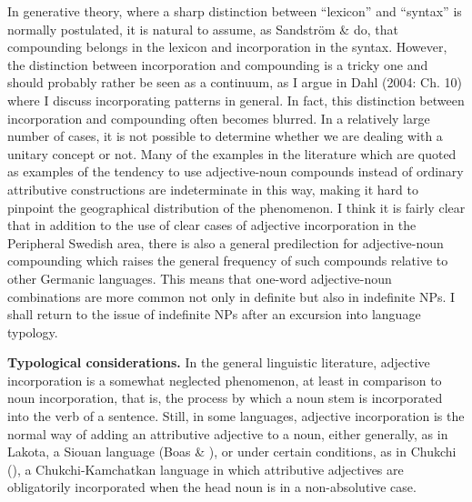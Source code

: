 \begin{styleBodytextC}
In generative theory, where a sharp distinction between “lexicon” and “syntax” is normally postulated, it is natural to assume, as Sandström \& \citet{Holmberg2003} do, that compounding belongs in the lexicon and incorporation in the syntax. However, the distinction between incorporation and compounding is a tricky one and should probably rather be seen as a continuum, as I argue in Dahl (2004: Ch. 10) where I discuss incorporating patterns in general. In fact, this distinction between incorporation and compounding often becomes blurred. In a relatively large number of cases, it is not possible to determine whether we are dealing with a unitary concept or not. Many of the examples in the literature which are quoted as examples of the tendency to use adjective-noun compounds instead of ordinary attributive constructions are indeterminate in this way, making it hard to pinpoint the geographical distribution of the phenomenon. I think it is fairly clear that in addition to the use of clear cases of adjective incorporation in the Peripheral Swedish area, there is also a general predilection for adjective-noun compounding which raises the general frequency of such compounds relative to other Germanic languages. This means that one-word adjective-noun combinations are more common not only in definite but also in indefinite NPs. I shall return to the issue of indefinite NPs after an excursion into language typology.

\end{styleBodytextC}

\begin{styleBodytextC}
\textbf{Typological considerations.} In the general linguistic literature, adjective incorporation is a somewhat neglected phenomenon, at least in comparison to noun incorporation, that is, the process by which a noun stem is incorporated into the verb of a sentence. Still, in some languages, adjective incorporation is the normal way of adding an attributive adjective to a noun, either generally, as in Lakota, a Siouan language (Boas \& \citet{Deloria1941}), or under certain conditions, as in Chukchi (\citet[526]{Muravyova1998}), a Chukchi-Kamchatkan language in which attributive adjectives are obligatorily incorporated when the head noun is in a non-absolutive case.

\end{styleBodytextC}

